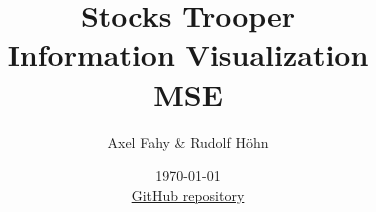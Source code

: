 \documentclass[11pt]{report}
\begin{document}
\title{Stocks Trooper\\Information Visualization\\MSE}
\date{\today\\\href{https://github.com/rudy2707/Stockstrooper}{GitHub repository}}
\author{Axel Fahy \& Rudolf Höhn}
\maketitle

\tableofcontents

\pagestyle{fancy}     %









\appendix


\end{document}
